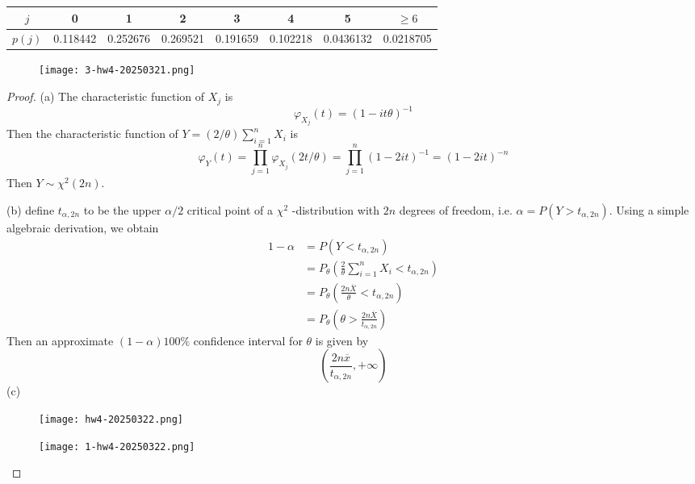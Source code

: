 \begin{table}[h]
	\centering
	\begin{tabular}{|c|c|c|c|c|c|c|c|}
		\hline
		$j$ & 0 & 1 & 2 & 3 & 4 & 5 & $\geq6$ \\
		\hline
		$p(j)$ & 0.118442 & 0.252676 & 0.269521 & 0.191659 & 0.102218 & 0.0436132 & 0.0218705 \\
		\hline
	\end{tabular}
\end{table}
\begin{figure}[H]
\centering
\texttt{[image: 3-hw4-20250321.png]}
\label{}
\end{figure}

\begin{proof}
(a) The characteristic function of $X_j$ is
\[
\varphi_{X_j}(t)=\left( 1-it\theta \right)^{-1}
\]
Then the characteristic function of $Y=(2/\theta)\sum_{i=1}^{n}X_i$ is
\[
\varphi_{Y}(t)=\prod_{j=1}^{n} \varphi_{X_j}(2t/\theta)=\prod_{j=1}^{n} \left( 1-2it \right)^{-1}=(1-2it)^{-n}
\]
Then $Y\sim \chi^{2}(2n)$.

(b) define $t_{\alpha,2n}$ to be the upper $\alpha/2$ critical point of a $\chi^{2}$ -distribution with $2n$ degrees of freedom, i.e. $\alpha =P(Y>t_{\alpha,2n})$. Using a simple algebraic derivation, we obtain
\[
\begin{aligned}
1-\alpha & =P(Y<t_{\alpha,2n}) \\
 &  =P_{\theta}\left( \frac{2}{\theta} \sum_{i=1}^{n} X_i<t_{\alpha,2n} \right) \\
 & =P_{\theta}\left( \frac{2n\overline{X}}{\theta}<t_{\alpha,2n} \right) \\
 & =P_{\theta}\left( \theta>\frac{2n\overline{X}}{t_{\alpha,2n}} \right)
\end{aligned}
\]
Then  an approximate $(1-\alpha) 100\%$ confidence interval for $\theta$ is given by
\[
\left( \frac{2n\overline{x}}{t_{\alpha,2n}},+\infty \right)
\]
(c)

\begin{figure}[H]
\centering
\texttt{[image: hw4-20250322.png]}
\label{}
\end{figure}

\begin{figure}[H]
\centering
\texttt{[image: 1-hw4-20250322.png]}
\label{}
\end{figure}

\end{proof}

